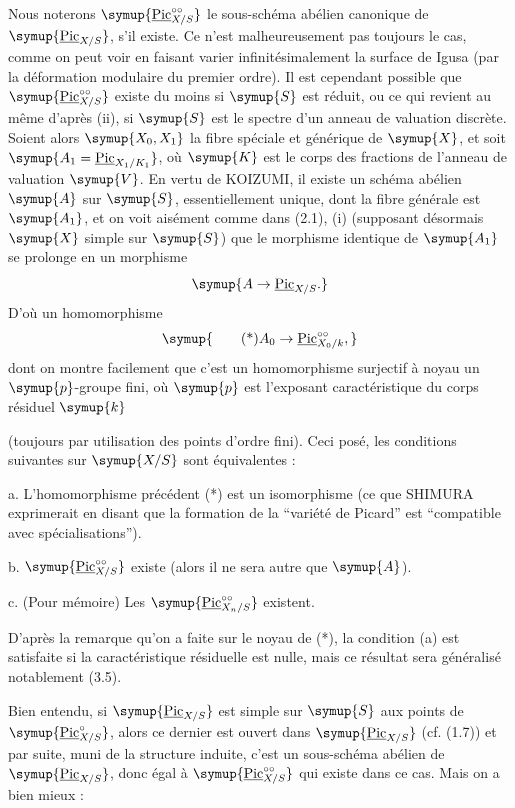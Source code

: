  Nous noterons
$\symup{\underline{\operatorname{Pic}}_{X/S}^{\circ\circ}}$ le sous-schéma abélien canonique de
$\symup{\underline{\operatorname{Pic}}_{X/S}}$, s'il existe. Ce n'est malheureusement pas toujours
le cas, comme on peut voir en faisant varier infinitésimalement la surface de
Igusa (par la déformation modulaire du premier ordre). Il est cependant
possible que $\symup{\underline{\operatorname{Pic}}_{X/S}^{\circ\circ}}$ existe du moins si $\symup{S}$
est réduit, ou ce qui revient au même d'après (ii), si $\symup{S}$ est le spectre d'un
anneau de valuation discrète. Soient alors $\symup{X_0,X_1}$ la fibre spéciale et
générique de $\symup{X}$, et soit $\symup{A_1=\underline{\operatorname{Pic}}_{X_1/K_1}}$, où $\symup{K}$ est le corps des fractions de l'anneau de valuation $\symup{V}$. En vertu de
KOIZUMI, il existe un schéma abélien $\symup{A}$ sur $\symup{S}$, essentiellement unique, dont
la fibre générale est $\symup{A_1}$, et on voit aisément comme dans (2.1), (i)
(supposant désormais $\symup{X}$ simple sur $\symup{S}$) que le morphisme identique de $\symup{A_1}$
se prolonge en un morphisme
\[
\symup{A\to\underline{\operatorname{Pic}}_{X/S}.}
\]
D'où un homomorphisme
\[
\symup{\tag{*}A_0\to\underline{\operatorname{Pic}}_{X_0/k}^{\circ\circ},}
\]
dont on montre facilement que c'est un homomorphisme surjectif à noyau un
$\symup{p}$-groupe fini, où $\symup{p}$ est l'exposant caractéristique du corps résiduel $\symup{k}$

(toujours par utilisation des points d'ordre fini). Ceci posé, les conditions
suivantes sur $\symup{X/S}$ sont équivalentes :

\medskip
\noindent a. L'homomorphisme précédent (*) est un isomorphisme (ce que SHIMURA
exprimerait en disant que la formation de la ``variété de Picard'' est
``compatible avec spécialisations'').

\noindent b. $\symup{\underline{\operatorname{Pic}}_{X/S}^{\circ\circ}}$ existe (alors il ne sera
autre que $\symup{A}$).

\noindent c. (Pour mémoire) Les
$\symup{\underline{\operatorname{Pic}}_{X_n/S}^{\circ\circ}}$ existent.

D'après la remarque qu'on a faite sur le noyau de (*), la condition (a) est
satisfaite si la caractéristique résiduelle est nulle, mais ce résultat sera
généralisé notablement (3.5).

Bien entendu, si $\symup{\underline{\operatorname{Pic}}_{X/S}}$ est simple sur $\symup{S}$ aux points de
$\symup{\underline{\operatorname{Pic}}_{X/S}^\circ}$, alors ce dernier est ouvert dans
$\symup{\underline{\operatorname{Pic}}_{X/S}}$ (cf. (1.7)) et par suite, muni de la structure
induite, c'est un sous-schéma abélien de $\symup{\underline{\operatorname{Pic}}_{X/S}}$, donc égal
à $\symup{\underline{\operatorname{Pic}}_{X/S}^{\circ\circ}}$ qui existe dans ce cas. Mais on a
bien mieux :

